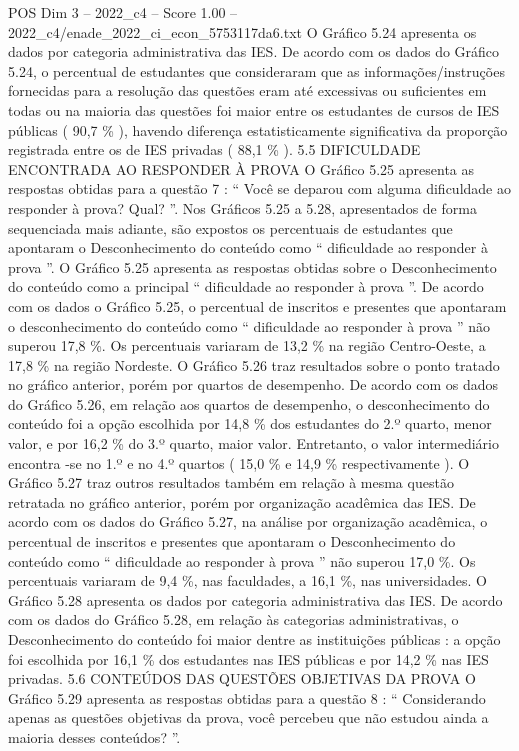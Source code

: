 \begin{textsample}{POS Dim 3 – 2022\_c4 – Score 1.00 – 2022\_c4/enade\_2022\_ci\_econ\_5753117da6.txt}
O Gráfico 5.24 apresenta os dados por categoria administrativa das IES.
De acordo com os dados do Gráfico 5.24, o percentual de estudantes que consideraram que as informações/instruções fornecidas para a resolução das questões eram até excessivas ou suficientes em todas ou na maioria das questões foi maior entre os estudantes de cursos de IES públicas ( 90,7 \% ), havendo diferença estatisticamente significativa da proporção registrada entre os de IES privadas ( 88,1 \% ). 5.5 DIFICULDADE ENCONTRADA AO RESPONDER À PROVA O Gráfico 5.25 apresenta as respostas obtidas para a questão 7 : “ Você se deparou com alguma dificuldade ao responder à prova?
Qual? ”.
Nos Gráficos 5.25 a 5.28, apresentados de forma sequenciada mais adiante, são expostos os percentuais de estudantes que apontaram o Desconhecimento do conteúdo como “ dificuldade ao responder à prova ”.
O Gráfico 5.25 apresenta as respostas obtidas sobre o Desconhecimento do conteúdo como a principal “ dificuldade ao responder à prova ”.
De acordo com os dados o Gráfico 5.25, o percentual de inscritos e presentes que apontaram o desconhecimento do conteúdo como “ dificuldade ao responder à prova ” não superou 17,8 \%.
Os percentuais variaram de 13,2 \% na região Centro-Oeste, a 17,8 \% na região Nordeste.
O Gráfico 5.26 traz resultados sobre o ponto tratado no gráfico anterior, porém por quartos de desempenho.
De acordo com os dados do Gráfico 5.26, em relação aos quartos de desempenho, o desconhecimento do conteúdo foi a opção escolhida por 14,8 \% dos estudantes do 2.º quarto, menor valor, e por 16,2 \% do 3.º quarto, maior valor.
Entretanto, o valor intermediário encontra -se no 1.º e no 4.º quartos ( 15,0 \% e 14,9 \% respectivamente ).
O Gráfico 5.27 traz outros resultados também em relação à mesma questão retratada no gráfico anterior, porém por organização acadêmica das IES.
De acordo com os dados do Gráfico 5.27, na análise por organização acadêmica, o percentual de inscritos e presentes que apontaram o Desconhecimento do conteúdo como “ dificuldade ao responder à prova ” não superou 17,0 \%.
Os percentuais variaram de 9,4 \%, nas faculdades, a 16,1 \%, nas universidades.
O Gráfico 5.28 apresenta os dados por categoria administrativa das IES.
De acordo com os dados do Gráfico 5.28, em relação às categorias administrativas, o Desconhecimento do conteúdo foi maior dentre as instituições públicas : a opção foi escolhida por 16,1 \% dos estudantes nas IES públicas e por 14,2 \% nas IES privadas. 5.6 CONTEÚDOS DAS QUESTÕES OBJETIVAS DA PROVA O Gráfico 5.29 apresenta as respostas obtidas para a questão 8 : “ Considerando apenas as questões objetivas da prova, você percebeu que não estudou ainda a maioria desses conteúdos? ”.

\end{textsample}
